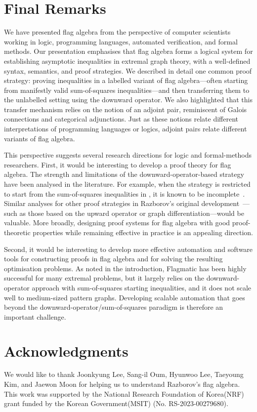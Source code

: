 \documentclass{article}
\begin{document}
\section{Final Remarks}
\label{sec:conclusion}

We have presented flag algebra from the perspective of computer scientists working in logic, programming languages, automated verification, and formal methods. Our presentation emphasises that flag algebra forms a logical system for establishing asymptotic inequalities in extremal graph theory, with a well-defined syntax, semantics, and proof strategies. We described in detail one common proof strategy: proving inequalities in a labelled variant of flag algebra---often starting from manifestly valid sum-of-squares inequalities---and then transferring them to the unlabelled setting using the downward operator. We also highlighted that this transfer mechanism relies on the notion of an adjoint pair, reminiscent of Galois connections and categorical adjunctions. Just as these notions relate different interpretations of programming languages or logics, adjoint pairs relate different variants of flag algebra.

This perspective suggests several research directions for logic and formal-methods researchers. First, it would be interesting to develop a proof theory for flag algebra. The strength and limitations of the downward-operator-based strategy have been analysed in the literature. For example, when the strategy is restricted to start from the sum-of-squares inequalities in , it is known to be incomplete~\cite{Hatami2011undecidability,Blekherman2020simple}. Similar analyses for other proof strategies in Razborov's original development~\cite{Razborov2007}---such as those based on the upward operator or graph differentiation---would be valuable. More broadly, designing proof systems for flag algebra with good proof-theoretic properties while remaining effective in practice is an appealing direction.

Second, it would be interesting to develop more effective automation and software tools for constructing proofs in flag algebra and for solving the resulting optimisation problems. As noted in the introduction, {\sc Flagmatic} has been highly successful for many extremal problems, but it largely relies on the downward-operator approach with sum-of-squares starting inequalities, and it does not scale well to medium-sized pattern graphs. Developing scalable automation that goes beyond the downward-operator/sum-of-squares paradigm is therefore an important challenge.

\section*{Acknowledgments}
We would like to thank Joonkyung Lee, Sang-il Oum, Hyunwoo Lee, Taeyoung Kim, and Jaewon Moon for helping us to understand Razborov's flag algebra. This work was supported by the National Research Foundation of Korea(NRF) grant funded by the Korean Government(MSIT) (No. RS-2023-00279680).



\end{document}
